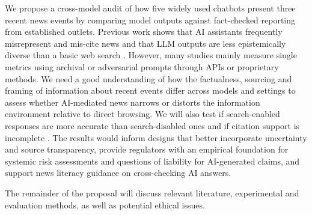 We propose a cross-model audit of how five widely used chatbots present three recent news events by comparing model outputs against fact-checked reporting from established outlets. Previous work shows that AI assistants frequently misrepresent and mis-cite news \citep{ebu2025newsintegrity, jazwinska2025citation} and that LLM outputs are less epistemically diverse than a basic web search \citep{wright2025epistemic}. However, many studies mainly measure single metrics using archival or adversarial prompts through APIs or proprietary methods. We need a good understanding of how the factualness, sourcing and framing of information about recent events differ across models and settings to assess whether AI-mediated news narrows or distorts the information environment relative to direct browsing. We will also test if search-enabled responses are more accurate than search-disabled ones and if citation support is incomplete \citep{newsguard2025monitor, robotstxt2025misinfo}. The results would inform designs that better incorporate uncertainty and source transparency, provide regulators with an empirical foundation for systemic risk assessments and questions of liability for AI-generated claims, and support news literacy guidance on cross-checking AI answers.

The remainder of the proposal will discuss relevant literature, experimental and evaluation methods, as well as potential ethical issues.
